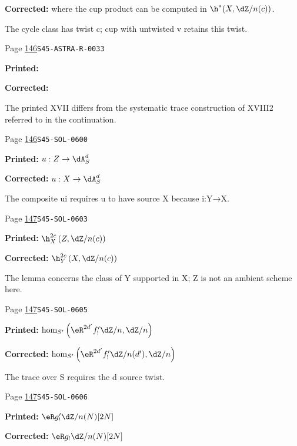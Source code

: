 \begin{description}
\par\noindent\textbf{Corrected:} where the cup product can be computed in $\h^*(X,\dZ/n(c))$.
\par\noindent The cycle class has twist c; cup with untwisted v retains this twist.
\smallskip
\item[\hypertarget{apparatus:EN-0073}{73}] Page \hyperlink{printpage:en:146}{146}\quad\texttt{S45-ASTRA-R-0033}
\par\noindent\textbf{Printed:} 
\par\noindent\textbf{Corrected:} 
\par\noindent The printed XVII differs from the systematic trace construction of XVIII2 referred to in the continuation.
\smallskip
\item[\hypertarget{apparatus:EN-0074}{74}] Page \hyperlink{printpage:en:146}{146}\quad\texttt{S45-SOL-0600}
\par\noindent\textbf{Printed:} \(u:Z\to \dA_S^d\)
\par\noindent\textbf{Corrected:} \(u:X\to \dA_S^d\)
\par\noindent The composite ui requires u to have source X because i:Y→X.
\smallskip
\item[\hypertarget{apparatus:EN-0075}{75}] Page \hyperlink{printpage:en:147}{147}\quad\texttt{S45-SOL-0603}
\par\noindent\textbf{Printed:} \(\h_X^{2 c}\left(Z,\dZ/n(c)\right)\)
\par\noindent\textbf{Corrected:} \(\h_Y^{2 c}\left(X,\dZ/n(c)\right)\)
\par\noindent The lemma concerns the class of Y supported in X; Z is not an ambient scheme here.
\smallskip
\item[\hypertarget{apparatus:EN-0076}{76}] Page \hyperlink{printpage:en:147}{147}\quad\texttt{S45-SOL-0605}
\par\noindent\textbf{Printed:} \(\hom_{S'}\left(\eR^{2 d'} f_!' \dZ/n,\dZ/n\right)\)
\par\noindent\textbf{Corrected:} \(\hom_{S'}\left(\eR^{2 d'} f_!' \dZ/n(d'),\dZ/n\right)\)
\par\noindent The trace over S requires the d source twist.
\smallskip
\item[\hypertarget{apparatus:EN-0077}{77}] Page \hyperlink{printpage:en:147}{147}\quad\texttt{S45-SOL-0606}
\par\noindent\textbf{Printed:} \(\eR g_!'\dZ/n(N)[2 N]\)
\par\noindent\textbf{Corrected:} \(\eR g_!\dZ/n(N)[2 N]\)

\end{description}
